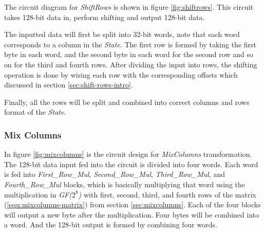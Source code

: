 \documentclass[a4paper, 10pt]{article}
\begin{document}
\begin{multicols}{2}
            The circuit diagram for \textit{ShiftRows} is shown in figure \ref{fig:shiftrows}. This circuit takes 128-bit data in, perform shifting and output 128-bit data.

            The inputted data will first be split into 32-bit words, note that each word corresponds to a column in the \textit{State}. The first row is formed by taking the first byte in each word, and the second byte in each word for the second row and so on for the third and fourth rows. After dividing the input into rows, the shifting operation is done by wiring each row with the corresponding offsets which discussed in section \ref{sec:shift-rows-intro}.

            Finally, all the rows will be split and combined into correct columns and rows format of the \textit{State}.

            \subsubsection{Mix Columns}

            In figure \ref{fig:mixcolumns} is the circuit design for \textit{MixColumns} transformation. The 128-bit data input fed into the circuit is divided into four words. Each word is fed into \textit{First\_Row\_Mul}, \textit{Second\_Row\_Mul}, \textit{Third\_Row\_Mul}, and \textit{Fourth\_Row\_Mul} blocks, which is basically multiplying that word using the multiplication in \textit{GF($2^{8}$)} with first, second, third, and fourth rows of the matrix (\ref{equ:mixcolumns-matrix}) from section \ref{sec:mixcolumns}. Each of the four blocks will output a new byte after the multiplication. Four bytes will be combined into a word. And the 128-bit output is formed by combining four words.


\end{multicols}
\end{document}
